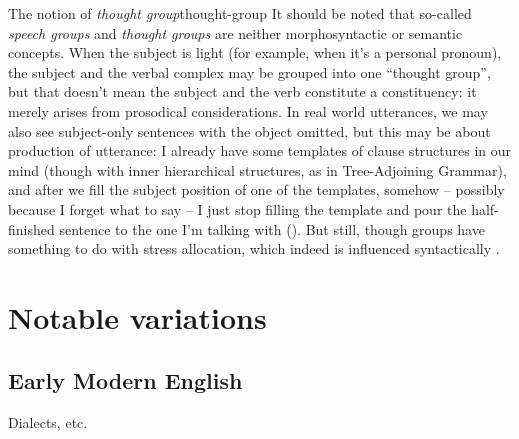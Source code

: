 \documentclass[UTF8, a4paper, oneside, scheme=plain]{ctexrep}
\newcommand*{\citepage}[1]{pp.~{#1}}
\newcommand*{\term}[1]{\emph{#1}}
\begin{document}
\begin{infobox}{The notion of \term{thought group}}{thought-group}
    It should be noted that so-called \term{speech groups}
    and \term{thought groups}
    are neither morphosyntactic or semantic concepts.
    When the subject is light (for example, when it's a personal pronoun),
    the subject and the verbal complex may be grouped into one ``thought group'',
    but that doesn't mean the subject and the verb constitute a constituency:
    it merely arises from prosodical considerations.
    In real world utterances, 
    we may also see subject-only sentences with the object omitted,
    but this may be about production of utterance:
    I already have some templates of clause structures in our mind
    (though with inner hierarchical structures, as in Tree-Adjoining Grammar),
    and after we fill the subject position of one of the templates,
    somehow -- possibly because I forget what to say -- 
    I just stop filling the template and pour the half-finished sentence 
    to the one I'm talking with
    ().
    But still, though groups have something to do with stress allocation,
    which indeed is influenced syntactically \citep[\citepage{7}]{kahnemuyipour2009syntax}. 
\end{infobox}

\chapter{Notable variations}

\section{Early Modern English}

Dialects, etc.





\end{document}
